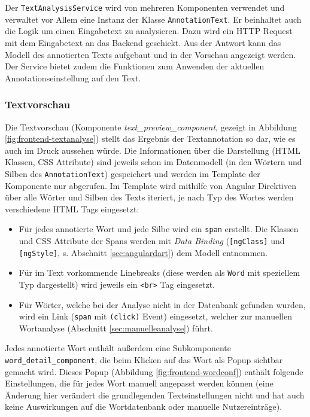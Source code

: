Der \texttt{TextAnalysisService} wird von mehreren Komponenten verwendet und verwaltet vor Allem eine Instanz der Klasse \texttt{AnnotationText}. Er beinhaltet auch die Logik um einen Eingabetext zu analysieren. Dazu wird ein HTTP Request mit dem Eingabetext an das Backend geschickt. Aus der Antwort kann das Modell des annotierten Texts aufgebaut und in der Vorschau angezeigt werden. Der Service bietet zudem die Funktionen zum Anwenden der aktuellen Annotationseinstellung auf den Text.

\subsubsection{Textvorschau}

Die Textvorschau (Komponente \textit{text\_preview\_component}, gezeigt in Abbildung \ref{fig:frontend-textanalyse}) stellt das Ergebnis der Textannotation so dar, wie es auch im Druck aussehen würde. Die Informationen über die Darstellung (HTML Klassen, CSS Attribute) sind jeweils schon im Datenmodell (in den Wörtern und Silben des \texttt{AnnotationText}) gespeichert und werden im Template der Komponente nur abgerufen. Im Template wird mithilfe von Angular Direktiven über alle Wörter und Silben des Texts iteriert, je nach Typ des Wortes werden verschiedene HTML Tags eingesetzt:
\begin{itemize}
	\item Für jedes annotierte Wort und jede Silbe wird ein \texttt{span} erstellt. Die Klassen und CSS Attribute der  Spans werden mit \textit{Data Binding} (\texttt{[ngClass]} und \texttt{[ngStyle]}, s. Abschnitt \ref{sec:angulardart}) dem Modell entnommen.
	
	\item Für im Text vorkommende Linebreaks (diese werden als \texttt{Word} mit speziellem Typ dargestellt) wird jeweils ein \texttt{<br>} Tag eingesetzt.
	
	\item Für Wörter, welche bei der Analyse nicht in der Datenbank gefunden wurden, wird ein Link (\texttt{span} mit \texttt{(click)} Event) eingesetzt, welcher zur manuellen Wortanalyse (Abschnitt \ref{sec:manuelleanalyse}) führt.
\end{itemize}

Jedes annotierte Wort enthält außerdem eine Subkomponente \texttt{word\_detail\_component}, die beim Klicken auf das Wort als Popup sichtbar gemacht wird. Dieses Popup (Abbildung \ref{fig:frontend-wordconf}) enthält folgende Einstellungen, die für jedes Wort manuell angepasst werden können (eine Änderung hier verändert die grundlegenden Texteinstellungen nicht und hat auch keine Auswirkungen auf die Wortdatenbank oder manuelle Nutzereinträge).

